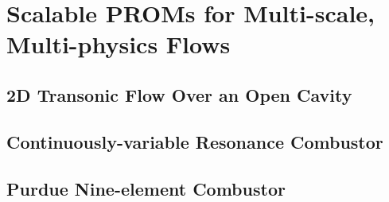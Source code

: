 \chapter{Scalable PROMs for Multi-scale, Multi-physics Flows}
\label{chap:HPROMResults}


\section{2D Transonic Flow Over an Open Cavity}\label{sec:cavity}

\section{Continuously-variable Resonance Combustor}\label{sec:cvrc}

\section{Purdue Nine-element Combustor}\label{sec:nineElem}


